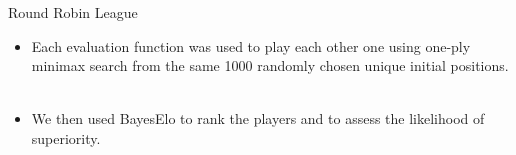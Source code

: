 \documentclass[compress]{beamer}
\begin{document}




\begin{frame}{Round Robin League}

\begin{itemize}
\item Each evaluation function was used to play each other one using one-ply minimax 
search from the same 1000 randomly chosen unique initial positions. \\ \ \pause
\item We then used BayesElo to rank the players and to assess the likelihood of superiority.\\ 
\end{itemize}


\end{frame}
\end{document}
